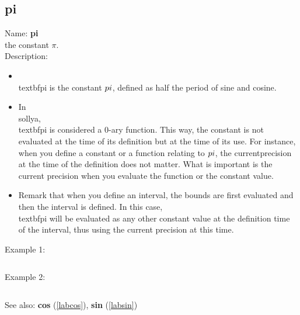 \subsection{pi}
\label{labpi}
\noindent Name: \textbf{pi}\\
the constant $\pi$.\\
\noindent Description: \begin{itemize}

\item \\textbf{pi} is the constant $\\pi$, defined as half the period of sine and cosine.\n
\item In \\sollya, \\textbf{pi} is considered a 0-ary function. This way, the constant \n   is not evaluated at the time of its definition but at the time of its use. For \n   instance, when you define a constant or a function relating to $\\pi$, the current\n   precision at the time of the definition does not matter. What is important is \n   the current precision when you evaluate the function or the constant value.\n
\item Remark that when you define an interval, the bounds are first evaluated and \n   then the interval is defined. In this case, \\textbf{pi} will be evaluated as any \n   other constant value at the definition time of the interval, thus using the \n   current precision at this time.\n\end{itemize}
\noindent Example 1: 
\begin{center}\begin{minipage}{15cm}\begin{Verbatim}[frame=single]
\end{Verbatim}
\end{minipage}\end{center}
\noindent Example 2: 
\begin{center}\begin{minipage}{15cm}\begin{Verbatim}[frame=single]
\end{Verbatim}
\end{minipage}\end{center}
See also: \textbf{cos} (\ref{labcos}), \textbf{sin} (\ref{labsin})
